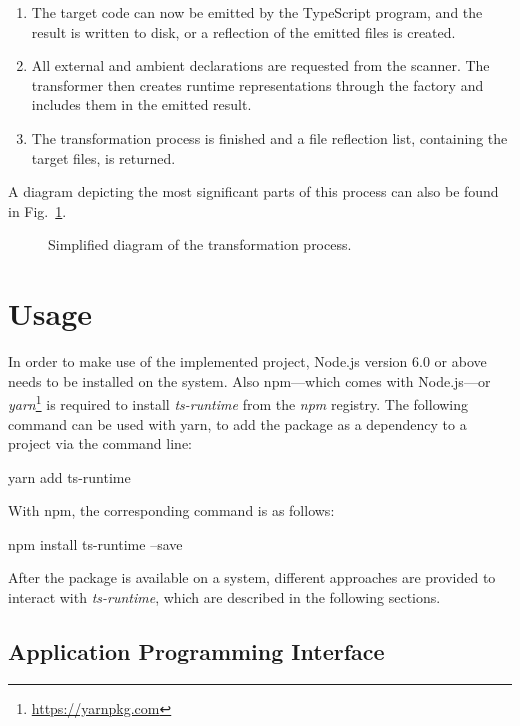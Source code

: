 \begin{enumerate}
  \item The target code can now be emitted by the TypeScript program, and the result is written to disk, or a reflection of the emitted files is created.
  \item All external and ambient declarations are requested from the scanner. The transformer then creates runtime representations through the factory and includes them in the emitted result.
  \item The transformation process is finished and a file reflection list, containing the target files, is returned.
\end{enumerate}
A diagram depicting the most significant parts of this process can also be found in Fig.~\ref{fig:transformation-process}.
\begin{figure}
\centering

\caption{Simplified diagram of the transformation process.}
\label{fig:transformation-process}
\end{figure}

\section{Usage}
\label{sec:usage}

In order to make use of the implemented project, Node.js version 6.0 or above needs to be installed on the system. Also npm---which comes with Node.js---or \emph{yarn}\footnote{\url{https://yarnpkg.com}} is required to install \emph{ts-runtime} from the \emph{npm} registry. The following command can be used with yarn, to add the package as a dependency to a project via the command line:
\begin{GenericCode}[numbers=none]
yarn add ts-runtime
\end{GenericCode}
With npm, the corresponding command is as follows:
\begin{GenericCode}[numbers=none]
npm install ts-runtime --save
\end{GenericCode}
After the package is available on a system, different approaches are provided to interact with \emph{ts-runtime}, which are described in the following sections.

\subsection{Application Programming Interface}
\label{sec:usage-api}

